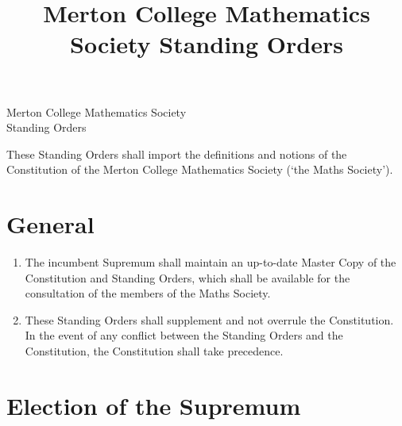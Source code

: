 \documentclass[pdftex,a4paper]{report}
\title{Merton College Mathematics Society Standing Orders}
\begin{document}
\begin{center}

	{\large Merton College Mathematics Society} \\[5pt]
	{\Huge Standing Orders}

\end{center}

These Standing Orders shall import the definitions and notions of the Constitution of the Merton College Mathematics Society (`the Maths Society').


\section*{General}

\begin{enumerate}[label=\Roman*)] 
	\item The incumbent Supremum shall maintain an up-to-date Master Copy of the Constitution and Standing Orders, which shall be available for the consultation of the members of the Maths Society.
	\item These Standing Orders shall supplement and not overrule the Constitution. In the event of any conflict between the Standing Orders and the Constitution, the Constitution shall take precedence.
\end{enumerate}


\section*{Election of the Supremum}
\end{document}
